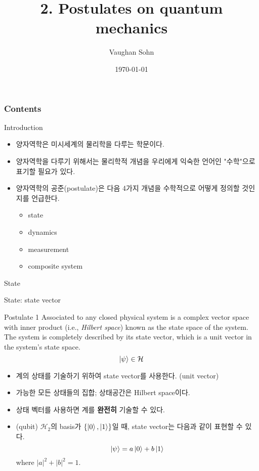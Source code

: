 \documentclass[9pt]{beamer}
\title{2. Postulates on quantum mechanics}
\date{\today}
\author{Vaughan Sohn}
\begin{document}
    \maketitle
    
    \begin{frame}
        \frametitle{Contents}
        \tableofcontents
    \end{frame}

    \begin{frame}{Introduction}
        \begin{itemize}
            \item 양자역학은 미시세계의 물리학을 다루는 학문이다. 
            \item 양자역학을 다루기 위해서는 물리학적 개념을 우리에게 익숙한 언어인 "\alert{수학}"으로 표기할 필요가 있다.
            \item 양자역학의 공준(postulate)은 다음 4가지 개념을 수학적으로 어떻게 정의할 것인지를 언급한다.
            \begin{itemize}
                \item state
                \item dynamics
                \item measurement
                \item composite system
            \end{itemize}
        \end{itemize}
    \end{frame}
    
    \begin{section}{State}
        \begin{frame}{State: state vector}
            \begin{block}{Postulate 1}
                Associated to any closed physical system is a complex vector space with inner product (i.e., \textit{Hilbert space}) known as the state space of the system. The system is completely described by its state vector, which is a unit vector in the system’s state space.
                $$ \ket \psi \in \mathcal H$$
            \end{block}
            \begin{itemize}
                \item 계의 상태를 기술하기 위하여 state vector를 사용한다. (unit vector)
                \item 가능한 모든 상태들의 집합; 상태공간은 Hilbert space이다.
                \item 상태 벡터를 사용하면 계를 \textbf{완전히} 기술할 수 있다.
                \item (qubit) $\mathcal H_2$의 basis가 $\{\ket 0, \ket 1\}$일 때, state vector는 다음과 같이 표현할 수 있다.
                $$\ket \psi = a \ket 0 + b \ket 1$$
                where $|a|^2 + |b|^2 = 1$.
            \end{itemize}
        \end{frame}
    \end{section}
\end{document}
